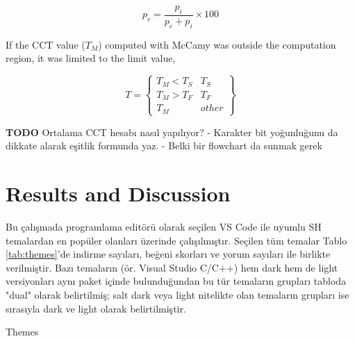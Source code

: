 \documentclass{article}
\begin{document}
\begin{equation}
p_r = \frac{p_i}{p_e + p_i} \times 100
\label{eq:pr}
\end{equation}

If the CCT value ($T_M$) computed with McCamy was outside the computation region, it was limited to the limit value,

\begin{equation}
T = \left \{ 
\begin{matrix}
T_M < T_S & T_S\\
T_M > T_F & T_F\\
T_M & other
\end{matrix}
\right \}
\label{eq:TS_TF}
\end{equation}

\textbf{TODO} Ortalama CCT hesabı nasıl yapılıyor?
- Karakter bit yoğunluğunu da dikkate alarak eşitlik formunda yaz.
- Belki bir flowchart da sunmak gerek

\section{Results and Discussion}

Bu çalışmada programlama editörü olarak seçilen VS Code ile uyumlu SH temalardan en popüler olanları üzerinde
çalışılmıştır.  Seçilen tüm temalar Tablo \ref{tab:themes}'de indirme sayıları, beğeni skorları ve yorum sayıları ile
birlikte verilmiştir.  Bazı temaların (ör. Visual Studio C/C++) hem dark hem de light versiyonları aynı paket içinde
bulunduğundan bu tür temaların grupları tabloda "dual" olarak belirtilmiş; salt dark veya light nitelikte olan temaların
grupları ise sırasıyla dark ve light olarak belirtilmiştir.


\begin{table}[H]

  \caption{Themes}
  \label{tab:themes}
\end{table}
\end{document}
